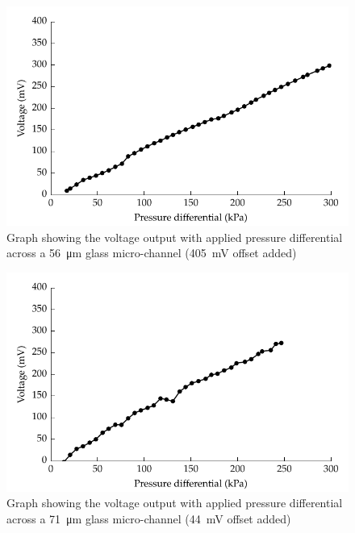\begin{figure}
    \centering
    \includegraphics{content/pt1/01-PowerHarvesting/graphics/streamingCell_voltVsPress_56um_out}
    \caption{\label{fig:VvsP_56um}Graph showing the voltage output with applied pressure differential across a \SI{56}{\micro\metre} glass micro-channel (\SI{405}{\milli\volt} offset added)}
\end{figure}

\begin{figure}
    \centering
    \includegraphics{content/pt1/01-PowerHarvesting/graphics/streamingCell_voltVsPress_71um_out}
    \caption{\label{fig:VvsP_71um}Graph showing the voltage output with applied pressure differential across a \SI{71}{\micro\metre} glass micro-channel (\SI{44}{\milli\volt} offset added)}
\end{figure}

